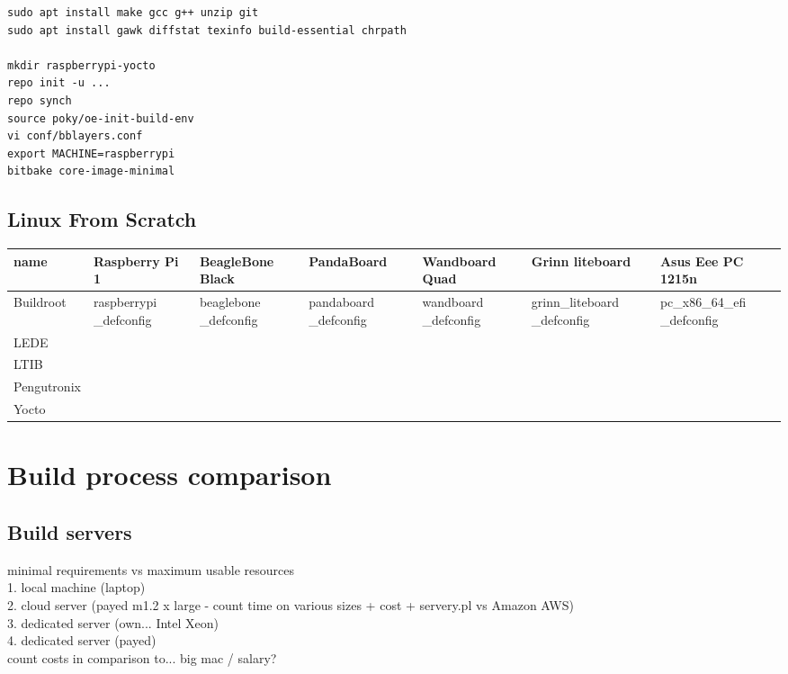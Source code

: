 \documentclass[printmode]{mgr}
\begin{document}
\begin{lstlisting}
sudo apt install make gcc g++ unzip git
sudo apt install gawk diffstat texinfo build-essential chrpath

mkdir raspberrypi-yocto
repo init -u ...
repo synch
source poky/oe-init-build-env
vi conf/bblayers.conf
export MACHINE=raspberrypi
bitbake core-image-minimal
\end{lstlisting}

\section{Linux From Scratch}

\begin{landscape}

\begin{table}
  \begin{tabular}{| p{2.5cm} | p{3cm} | p{3cm} | p{3cm} | p{3cm} | p{3cm} | p{3cm} |}
    \hline
    name & Raspberry Pi 1 & BeagleBone Black & PandaBoard & Wandboard Quad & Grinn liteboard & Asus Eee PC 1215n \\
    \hline
    Buildroot & raspberrypi \_defconfig &  beaglebone \_defconfig & pandaboard \_defconfig & wandboard \_defconfig & grinn\_liteboard \_defconfig & pc\_x86\_64\_efi \_defconfig \\
    \hline
    LEDE & & & & & & \\
    \hline
    LTIB & & & & & & \\
    \hline
    Pengutronix & & & & & & \\
    \hline
    Yocto & & & & & & \\
    \hline
  \end{tabular}
\end{table}

\end{landscape}


\chapter{Build process comparison}
\label{chapter:methodology}

\section{Build servers}
minimal requirements vs maximum usable resources\\
1. local machine (laptop)\\
2. cloud server (payed m1.2 x large - count time on various sizes + cost + servery.pl vs Amazon AWS)\\
3. dedicated server (own... Intel Xeon)\\
4. dedicated server (payed)\\
count costs in comparison to... big mac / salary?
\end{document}
